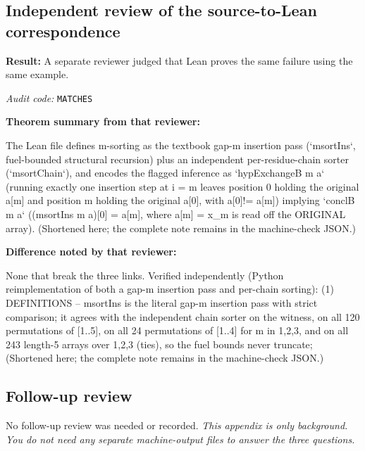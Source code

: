 \documentclass[11pt]{article}
\begin{document}
\subsection*{Independent review of the source-to-Lean correspondence}
\textbf{Result:} A separate reviewer judged that Lean proves the same failure using the same example.
\par\textit{Audit code:} \nolinkurl{MATCHES}
\par\textbf{Theorem summary from that reviewer:}
\begin{Vsrc}
The Lean file defines m-sorting as the textbook gap-m insertion pass (`msortIns`, fuel-bounded structural recursion) plus an independent per-residue-chain sorter (`msortChain`), and encodes the flagged inference as `hypExchangeB m a` (running exactly one insertion step at i = m leaves position 0 holding the original a[m] and position m holding the original a[0], with a[0]!= a[m]) implying `conclB m a` ((msortIns m a)[0] = a[m], where a[m] = x_m is read off the ORIGINAL array). (Shortened here; the complete note remains in the machine-check JSON.)
\end{Vsrc}
\par\textbf{Difference noted by that reviewer:}
\begin{Vsrc}
None that break the three links. Verified independently (Python reimplementation of both a gap-m insertion pass and per-chain sorting): (1) DEFINITIONS -- msortIns is the literal gap-m insertion pass with strict comparison; it agrees with the independent chain sorter on the witness, on all 120 permutations of [1..5], on all 24 permutations of [1..4] for m in {1,2,3}, and on all 243 length-5 arrays over {1,2,3} (ties), so the fuel bounds never truncate; (Shortened here; the complete note remains in the machine-check JSON.)
\end{Vsrc}
\subsection*{Follow-up review}
No follow-up review was needed or recorded.
\textit{This appendix is only background. You do not need any separate machine-output files to answer the three questions.}
\end{document}
